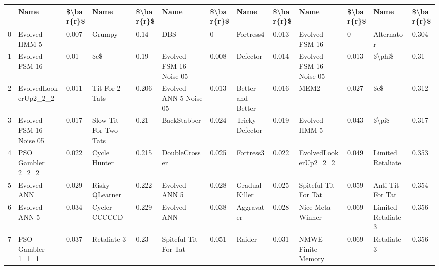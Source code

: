 \begin{tabular}{lllllllllllll}
\toprule
{} &                     Name & \$\textbackslash bar\{r\}\$ &                   Name & \$\textbackslash bar\{r\}\$ &                        Name & \$\textbackslash bar\{r\}\$ &               Name & \$\textbackslash bar\{r\}\$ &                       Name & \$\textbackslash bar\{r\}\$ &                 Name & \$\textbackslash bar\{r\}\$ \\
\midrule
0  &            Evolved HMM 5 &     0.007 &                 Grumpy &      0.14 &                         DBS &         0 &          Fortress4 &     0.013 &             Evolved FSM 16 &         0 &           Alternator &     0.304 \\
1  &           Evolved FSM 16 &      0.01 &                    \$e\$ &      0.19 &     Evolved FSM 16 Noise 05 &     0.008 &           Defector &     0.014 &    Evolved FSM 16 Noise 05 &     0.013 &               \$\textbackslash phi\$ &      0.31 \\
2  &     EvolvedLookerUp2\_2\_2 &     0.011 &         Tit For 2 Tats &     0.206 &      Evolved ANN 5 Noise 05 &     0.013 &  Better and Better &     0.016 &                       MEM2 &     0.027 &                  \$e\$ &     0.312 \\
3  &  Evolved FSM 16 Noise 05 &     0.017 &  Slow Tit For Two Tats &      0.21 &                 BackStabber &     0.024 &    Tricky Defector &     0.019 &              Evolved HMM 5 &     0.043 &                \$\textbackslash pi\$ &     0.317 \\
4  &        PSO Gambler 2\_2\_2 &     0.022 &           Cycle Hunter &     0.215 &               DoubleCrosser &     0.025 &          Fortress3 &     0.022 &       EvolvedLookerUp2\_2\_2 &     0.049 &    Limited Retaliate &     0.353 \\
5  &              Evolved ANN &     0.029 &         Risky QLearner &     0.222 &               Evolved ANN 5 &     0.028 &     Gradual Killer &     0.025 &       Spiteful Tit For Tat &     0.059 &     Anti Tit For Tat &     0.354 \\
6  &            Evolved ANN 5 &     0.034 &          Cycler CCCCCD &     0.229 &                 Evolved ANN &     0.038 &         Aggravater &     0.028 &           Nice Meta Winner &     0.069 &  Limited Retaliate 3 &     0.356 \\
7  &        PSO Gambler 1\_1\_1 &     0.037 &            Retaliate 3 &      0.23 &        Spiteful Tit For Tat &     0.051 &             Raider &     0.031 &         NMWE Finite Memory &     0.069 &          Retaliate 3 &     0.356 \\

\end{tabular}
